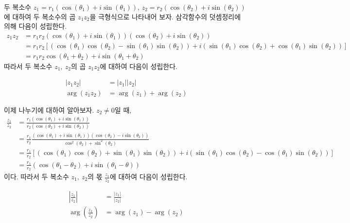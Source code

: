 \documentclass[11pt, a4paper]{book}
\begin{document}
 두 복소수 $z_{1} = r_{1}\left(\cos(\theta_{1}) + i \sin(\theta_{1})\right)$,  $z_{2} = r_{2}\left(\cos(\theta_{2}) + i \sin(\theta_{2})\right)$에 대하여 두 복소수의 곱 $z_{1}z_{2}$을 극형식으로 나타내어 보자. 삼각함수의 덧셈정리에 의해 다음이 성립한다.
 \begin{align*}
 	z_{1}z_{2} &=r_{1}r_{2} \left(\cos(\theta_{1}) + i \sin(\theta_{1})\right) \left(\cos(\theta_{2}) + i \sin(\theta_{2})\right)\\
 	&=r_{1}r_{2}\left[\left(\cos(\theta_{1})\cos(\theta_{2}) - \sin(\theta_{1})\sin(\theta_{2})\right)+ i \left(\sin(\theta_{1})\cos(\theta_{2}) + \cos(\theta_{1}) \sin(\theta_{2})\right)\right]\\
 	&=r_{1}r_{2}\cos(\theta_{1}+\theta_{2}) + i \sin(\theta_{1}+\theta_{2})
 \end{align*}
 따라서 두 복소수 $z_{1}, \: z_{2}$의 곱 $z_{1}z_{2}$에 대하여 다음이 성립한다.
 \begin{theorem}[복소수 곱의 성질]\vspace{-2em}
 \begin{align*}
	\vert z_{1} z_{2} \vert &= \vert z_{1} \vert \vert z_{2}\vert \\
	\arg(z_{1}z_{2}) &= \arg(z_{1}) +\arg(z_{2})
\end{align*}
\end{theorem}
이제 나누기에 대하여 알아보자. $z_{2}\neq 0$일 때,
\begin{align*}
	\frac{z_{1}}{z_{2}} &= \frac{r_{1}\left(\cos(\theta_{1}) + i \sin(\theta_{1})\right)}{r_{2}\left(\cos(\theta_{2})+ i \sin(\theta_{2})\right)} \\
	&= \frac{r_{1}}{r_{2}}\frac{\left(\cos(\theta_{1}) + i \sin(\theta_{1})\right)\left(\cos(\theta_{2})- i \sin(\theta_{2})\right)}{\cos^{2}(\theta_{2}) + \sin^{2}(\theta_{2})}\\
	&=\frac{r_{1}}{r_{2}} \left[\left(\cos(\theta_{1})\cos(\theta_{2})+ \sin(\theta_{1} )\sin(\theta_{2}) \right) + i \left(\sin(\theta_{1})\cos(\theta_{2}) - \cos(\theta_{1})\sin(\theta_{2})\right)\right]\\
	&= \frac{r_{1}}{r_{2}} \left(\cos(\theta_{1}-\theta_{2}) + i \sin(\theta_{1}-\theta)\right)
\end{align*}
이다. 따라서 두 복소수  $z_{1}, \: z_{2}$의 몫 $\frac{z_{1}}{z_{2}}$에 대하여 다음이 성립한다.
\begin{theorem}[복소수 몫의 성질]\vspace{-2em}
\begin{align*}
	\left| \frac{z_{1}}{ z_{2}} \right| &= \frac{\vert z_{1} \vert}{ \vert z_{2}\vert} \\
	\arg\left(\frac{z_{1}}{z_{2}}\right) &= \arg(z_{1}) -\arg(z_{2})
\end{align*}
\end{theorem}
\end{document}
